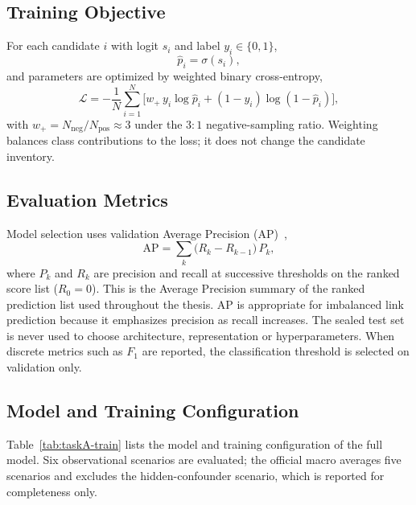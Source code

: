 \subsection{Training Objective}
\label{sec:taskA-loss}

For each candidate $i$ with logit $s_i$ and label $y_i\in\{0,1\}$,
\begin{equation}
\label{eq:taskA-sigmoid}
\hat{p}_{i}=\sigma(s_{i}),
\end{equation}
and parameters are optimized by weighted binary cross-entropy,
\begin{equation}
\label{eq:taskA-bce}
\mathcal{L}
=
-\frac{1}{N}
\sum_{i=1}^{N}
\bigl[
w_{+}\, y_{i}\log\hat{p}_{i}
+(1-y_{i})\log(1-\hat{p}_{i})
\bigr],
\end{equation}
with $w_{+}=N_{\mathrm{neg}}/N_{\mathrm{pos}}\approx 3$ under the $3{:}1$ negative-sampling ratio.
Weighting balances class contributions to the loss; it does not change the candidate inventory.

\subsection{Evaluation Metrics}
\label{sec:taskA-ap}

Model selection uses validation Average Precision (AP)~\cite{sklearn,davis2006},
\begin{equation}
\label{eq:taskA-ap}
\mathrm{AP}
=
\sum_{k}
\bigl(R_{k}-R_{k-1}\bigr)\,P_{k},
\end{equation}
where $P_k$ and $R_k$ are precision and recall at successive thresholds on the ranked score list ($R_0=0$).
This is the Average Precision summary of the ranked prediction list used throughout the thesis.
AP is appropriate for imbalanced link prediction because it emphasizes precision as recall increases.
The sealed test set is never used to choose architecture, representation or hyperparameters.
When discrete metrics such as $F_1$ are reported, the classification threshold is selected on validation only.

\subsection{Model and Training Configuration}
\label{sec:taskA-train-config}

Table~\ref{tab:taskA-train} lists the model and training configuration of the full model.
Six observational scenarios are evaluated; the official macro averages five scenarios and excludes the hidden-confounder scenario, which is reported for completeness only.

